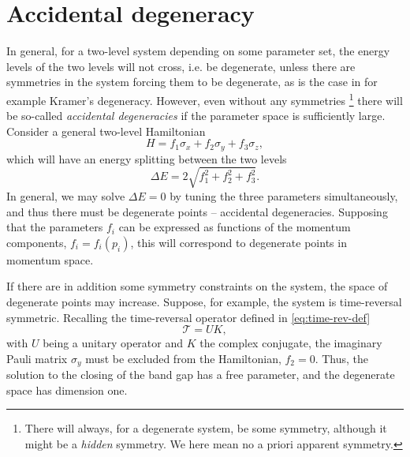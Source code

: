 \section{Accidental degeneracy}
\label{sec:accidental-degeneracy}
In general, for a two-level system depending on some parameter set, the energy levels of the two levels will not cross, i.e. be degenerate, unless there are symmetries in the system forcing them to be degenerate, as is the case in for example Kramer's degeneracy.
However, even without any symmetries%
\footnote{There will always, for a degenerate system, be some symmetry, although it might be a \emph{hidden} symmetry. We here mean no a priori apparent symmetry.}
there will be so-called \emph{accidental degeneracies} if the parameter space is sufficiently large.
Consider a general two-level Hamiltonian
\begin{equation}
  H = f_1 \sigma_x + f_2 \sigma_y + f_3 \sigma_z,
\end{equation}
which will have an energy splitting between the two levels
\begin{equation}
  \Delta E = 2 \sqrt{
    f_1^2 + f_2^2 + f_3^2
  }.
\end{equation}
In general, we may solve $\Delta E = 0$ by tuning the three parameters simultaneously, and thus there must be degenerate points -- accidental degeneracies.
Supposing that the parameters $f_i$ can be expressed as functions of the momentum components, $f_i =f_i(p_i)$, this will correspond to degenerate points in momentum space.

If there are in addition some symmetry constraints on the system, the space of degenerate points may increase.
Suppose, for example, the system is time-reversal symmetric.
Recalling the time-reversal operator defined in \cref{eq:time-rev-def}
$$
\mathcal{T} = UK,
$$
with $U$ being a unitary operator and $K$ the complex conjugate, the imaginary Pauli matrix $\sigma_y$ must be excluded from the Hamiltonian, \( f_2 = 0 \).
Thus, the solution to the closing of the band gap has a free parameter, and the degenerate space has dimension one.
